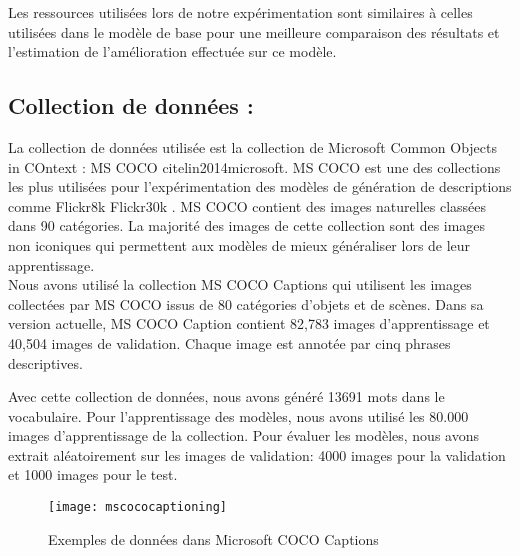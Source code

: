 Les ressources utilisées lors de notre expérimentation sont similaires à celles utilisées dans le modèle de base \cite{mao2014deep} \cite{mao2015learning} pour une meilleure comparaison des résultats et l'estimation de l'amélioration effectuée sur ce modèle.

\subsection{Collection de données :}

La collection de données utilisée est la collection de Microsoft Common Objects in COntext : MS COCO cite{lin2014microsoft}. MS COCO  est une des collections les plus utilisées pour l'expérimentation des modèles de génération de descriptions comme Flickr8k \cite{hodosh2013framing} Flickr30k \cite{young2014image}. MS COCO contient des images naturelles classées dans 90 
catégories. La majorité des images de cette collection sont des images non iconiques  qui permettent aux modèles de mieux généraliser lors de leur apprentissage.\\
Nous avons utilisé la collection MS COCO Captions \cite{chen2015microsoft} qui utilisent les images collectées par MS COCO issus de 80 catégories d'objets et de scènes. Dans sa version actuelle, MS COCO Caption contient 82,783 images d'apprentissage et 40,504 images de validation. Chaque image est annotée par cinq phrases descriptives.

Avec cette collection de données, nous avons généré 13691 mots dans le vocabulaire. Pour l'apprentissage des modèles, nous avons utilisé les 80.000 images d'apprentissage de la collection. Pour évaluer les modèles, nous avons extrait aléatoirement sur les images de validation: 4000 images pour la validation et 1000 images pour le test. 
\\
\medskip
\begin{figure}[h]
	\begin{center}
		\texttt{[image: mscococaptioning]}
		\caption{Exemples de données dans Microsoft COCO Captions \cite{chen2015microsoft}}
	\end{center}
\end{figure}


